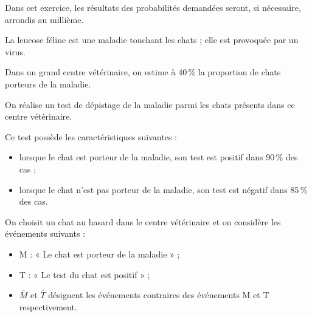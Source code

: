 Dans cet exercice, les résultats des probabilités demandées seront, si nécessaire, arrondis au
millième.

La leucose féline est une maladie touchant les chats ; elle est provoquée par un virus.

Dans un grand centre vétérinaire, on estime à 40\,\% la proportion de chats porteurs de la maladie.

On réalise un test de dépistage de la maladie parmi les chats présents dans ce centre vétérinaire.

Ce test possède les caractéristiques suivantes :

\begin{itemize}
	\item lorsque le chat est porteur de la maladie, son test est positif dans 90\,\% des cas ;
	\item lorsque le chat n’est pas porteur de la maladie, son test est négatif dans 85\,\% des cas.
\end{itemize}

On choisit un chat au hasard dans le centre vétérinaire et on considère les événements suivants :

\begin{itemize}
	\item M : « Le chat est porteur de la maladie » ;
	\item T : « Le test du chat est positif » ;
	\item $\overline{M}$ et $\overline{T}$ désignent les événements contraires des événements M et T respectivement.
\end{itemize}

